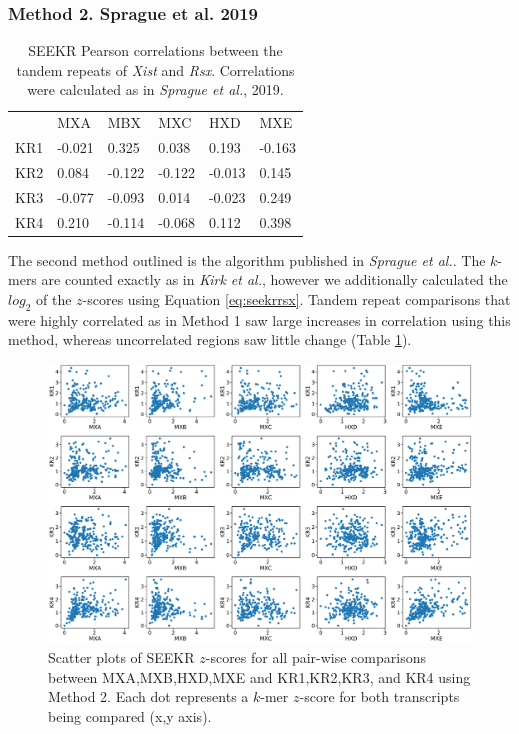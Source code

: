 \subsubsection{Method 2. Sprague et al. 2019}

\begin{table}[h]
\begin{center}
\begin{tabular}{llllll}
&MXA & MBX                  & MXC                  & HXD                  & MXE                                        \\
KR1 & -0.021 & 0.325   & 0.038 & 0.193   & -0.163 \\
KR2 & 0.084  & -0.122  & -0.122 & -0.013 & 0.145  \\
KR3 & -0.077   & -0.093 & 0.014 & -0.023 & 0.249   \\
KR4 & 0.210   & -0.114 & -0.068 & 0.112   & 0.398
\end{tabular}
\caption[Sprague et al. $k$-mer counting]{SEEKR Pearson correlations between the tandem repeats of \emph{Xist} and \emph{Rsx}. Correlations were calculated as in \emph{Sprague et al.}, 2019.}
\label{tbl:kmers2}

\end{center}
\end{table}

The second method outlined is the algorithm published in \emph{Sprague et al.}. The $k$-mers are counted exactly as in \emph{Kirk et al.}, however we additionally calculated the $log_2$ of the $z$-scores using Equation \ref{eq:seekrrsx}. Tandem repeat comparisons that were highly correlated as in Method 1 saw large increases in correlation using this method, whereas uncorrelated regions saw little change (Table \ref{tbl:kmers2}). 

\begin{figure}[h]
\centering
\includegraphics[width=\textwidth]{images/rsxscatter.pdf}
\caption[Sprague et al. $k$-mer counting $z$-score scatter plots]{Scatter plots of SEEKR $z$-scores for all pair-wise comparisons between MXA,MXB,HXD,MXE and KR1,KR2,KR3, and KR4 using Method 2. Each dot represents a $k$-mer $z$-score for both transcripts being compared (x,y axis).}
\label{fig:rsxscat}
\end{figure}


